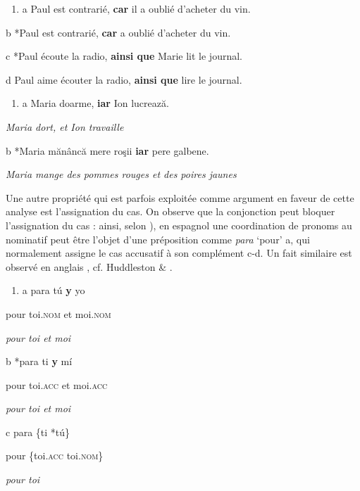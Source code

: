 \begin{enumerate}
\item \label{bkm:Ref301782840}a  Paul est contrarié, \textbf{car} il a oublié d'acheter du vin.


\end{enumerate}
  b  *Paul est contrarié, \textbf{car} a oublié d'acheter du vin.

  c  *Paul écoute la radio, \textbf{ainsi que} Marie lit le journal.

  d  Paul aime écouter la radio, \textbf{ainsi que} lire le journal.


\begin{enumerate}
\item \label{bkm:Ref301783815}a  Maria doarme, \textbf{iar} Ion lucrează.


\end{enumerate}
{\itshape
Maria dort, et Ion travaille}

  b  *Maria mănâncă mere roşii \textbf{iar} pere galbene.

{\itshape
Maria mange des pommes rouges et des poires jaunes}

Une autre propriété qui est parfois exploitée comme argument en faveur de cette analyse est l'assignation du cas. On observe que la conjonction peut bloquer l'assignation du cas : ainsi, selon \citet{Johannessen1998}), en espagnol une coordination de pronoms au nominatif peut être l'objet d'une préposition comme \textit{para} `pour' a, qui normalement assigne le cas accusatif à son complément c-d. Un fait similaire est observé en anglais , cf. Huddleston \& \citet{Pullum2002}.  


\begin{enumerate}
\item \label{bkm:Ref301786034}a  para  tú  \textbf{y } yo


\end{enumerate}
pour  toi\textsc{.nom}  et  moi.\textsc{nom}

{\itshape
pour toi et moi}

  b  *para  ti  \textbf{y } mí

    pour  toi\textsc{.acc}  et  moi.\textsc{acc}

{\itshape
pour toi et moi}

  c  para  \{ti  {\textbar} *tú\}

pour  \{toi.\textsc{acc  {\textbar}} toi.\textsc{nom\}}

{\itshape
pour toi}

